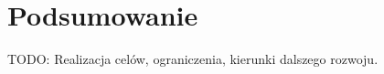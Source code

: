 \chapter{Podsumowanie}
\label{chapt:Podsumowanie}

TODO: Realizacja celów, ograniczenia, kierunki dalszego rozwoju.
